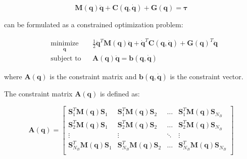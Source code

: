 \begin{equation}
    \mathbf{M} (\mathbf{q}) \ddot{\mathbf{q}} + \mathbf{C} (\mathbf{q}, \dot{\mathbf{q}}) + \mathbf{G} (\mathbf{q}) = \boldsymbol{\tau}
\end{equation}

can be formulated as a constrained optimization problem:

\begin{equation}
    \begin{aligned}
         & \underset{\ddot{\mathbf{q}}}{\text{minimize}}
         &                                               & \frac{1}{2} \ddot{\mathbf{q}} ^T \mathbf{M} (\mathbf{q}) \ddot{\mathbf{q}} + \dot{\mathbf{q}} ^T \mathbf{C} (\mathbf{q}, \dot{\mathbf{q}}) + \mathbf{G} (\mathbf{q}) ^T \ddot{\mathbf{q}} \\
         & \text{subject to}
         &                                               & \mathbf{A} (\mathbf{q}) \ddot{\mathbf{q}} = \mathbf{b} (\mathbf{q}, \dot{\mathbf{q}})
    \end{aligned}
\end{equation}

where $\mathbf{A} (\mathbf{q})$ is the constraint matrix and $\mathbf{b} (\mathbf{q}, \dot{\mathbf{q}})$ is the constraint vector.

The constraint matrix $\mathbf{A} (\mathbf{q})$ is defined as:

\begin{equation}
    \mathbf{A} (\mathbf{q}) = \begin{bmatrix}
        \mathbf{S} _1 ^T \mathbf{M} (\mathbf{q}) \mathbf{S} _1     & \mathbf{S} _1 ^T \mathbf{M} (\mathbf{q}) \mathbf{S} _2     & \dots  & \mathbf{S} _1 ^T \mathbf{M} (\mathbf{q}) \mathbf{S} _{N_B}     \\
        \mathbf{S} _2 ^T \mathbf{M} (\mathbf{q}) \mathbf{S} _1     & \mathbf{S} _2 ^T \mathbf{M} (\mathbf{q}) \mathbf{S} _2     & \dots  & \mathbf{S} _2 ^T \mathbf{M} (\mathbf{q}) \mathbf{S} _{N_B}     \\
        \vdots                                                     & \vdots                                                     & \ddots & \vdots                                                         \\
        \mathbf{S} _{N_B} ^T \mathbf{M} (\mathbf{q}) \mathbf{S} _1 & \mathbf{S} _{N_B} ^T \mathbf{M} (\mathbf{q}) \mathbf{S} _2 & \dots  & \mathbf{S} _{N_B} ^T \mathbf{M} (\mathbf{q}) \mathbf{S} _{N_B} \\
    \end{bmatrix}
\end{equation}

